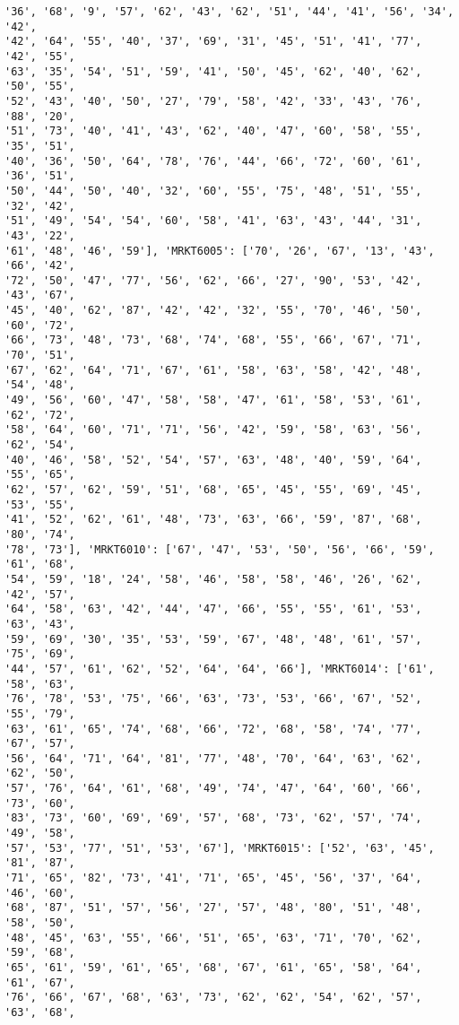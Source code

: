 \documentclass[11pt]{article}
\begin{document}
\begin{Verbatim}[commandchars=\\\{\}]
'36', '68', '9', '57', '62', '43', '62', '51', '44', '41', '56', '34', '42',
'42', '64', '55', '40', '37', '69', '31', '45', '51', '41', '77', '42', '55',
'63', '35', '54', '51', '59', '41', '50', '45', '62', '40', '62', '50', '55',
'52', '43', '40', '50', '27', '79', '58', '42', '33', '43', '76', '88', '20',
'51', '73', '40', '41', '43', '62', '40', '47', '60', '58', '55', '35', '51',
'40', '36', '50', '64', '78', '76', '44', '66', '72', '60', '61', '36', '51',
'50', '44', '50', '40', '32', '60', '55', '75', '48', '51', '55', '32', '42',
'51', '49', '54', '54', '60', '58', '41', '63', '43', '44', '31', '43', '22',
'61', '48', '46', '59'], 'MRKT6005': ['70', '26', '67', '13', '43', '66', '42',
'72', '50', '47', '77', '56', '62', '66', '27', '90', '53', '42', '43', '67',
'45', '40', '62', '87', '42', '42', '32', '55', '70', '46', '50', '60', '72',
'66', '73', '48', '73', '68', '74', '68', '55', '66', '67', '71', '70', '51',
'67', '62', '64', '71', '67', '61', '58', '63', '58', '42', '48', '54', '48',
'49', '56', '60', '47', '58', '58', '47', '61', '58', '53', '61', '62', '72',
'58', '64', '60', '71', '71', '56', '42', '59', '58', '63', '56', '62', '54',
'40', '46', '58', '52', '54', '57', '63', '48', '40', '59', '64', '55', '65',
'62', '57', '62', '59', '51', '68', '65', '45', '55', '69', '45', '53', '55',
'41', '52', '62', '61', '48', '73', '63', '66', '59', '87', '68', '80', '74',
'78', '73'], 'MRKT6010': ['67', '47', '53', '50', '56', '66', '59', '61', '68',
'54', '59', '18', '24', '58', '46', '58', '58', '46', '26', '62', '42', '57',
'64', '58', '63', '42', '44', '47', '66', '55', '55', '61', '53', '63', '43',
'59', '69', '30', '35', '53', '59', '67', '48', '48', '61', '57', '75', '69',
'44', '57', '61', '62', '52', '64', '64', '66'], 'MRKT6014': ['61', '58', '63',
'76', '78', '53', '75', '66', '63', '73', '53', '66', '67', '52', '55', '79',
'63', '61', '65', '74', '68', '66', '72', '68', '58', '74', '77', '67', '57',
'56', '64', '71', '64', '81', '77', '48', '70', '64', '63', '62', '62', '50',
'57', '76', '64', '61', '68', '49', '74', '47', '64', '60', '66', '73', '60',
'83', '73', '60', '69', '69', '57', '68', '73', '62', '57', '74', '49', '58',
'57', '53', '77', '51', '53', '67'], 'MRKT6015': ['52', '63', '45', '81', '87',
'71', '65', '82', '73', '41', '71', '65', '45', '56', '37', '64', '46', '60',
'68', '87', '51', '57', '56', '27', '57', '48', '80', '51', '48', '58', '50',
'48', '45', '63', '55', '66', '51', '65', '63', '71', '70', '62', '59', '68',
'65', '61', '59', '61', '65', '68', '67', '61', '65', '58', '64', '61', '67',
'76', '66', '67', '68', '63', '73', '62', '62', '54', '62', '57', '63', '68',

\end{Verbatim}
\end{document}
